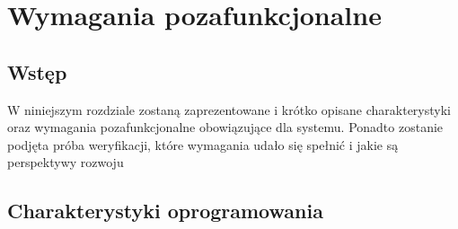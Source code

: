 \chapter{Wymagania pozafunkcjonalne}
\label{Chapter4}

\section{Wstęp}
\label{Chapter41}

W niniejszym rozdziale zostaną zaprezentowane i krótko opisane charakterystyki oraz wymagania pozafunkcjonalne obowiązujące dla systemu. Ponadto zostanie podjęta próba weryfikacji, które wymagania udało się spełnić i jakie są perspektywy rozwoju

\section{Charakterystyki oprogramowania}
\label{Chapter42}
%
%
%
%
